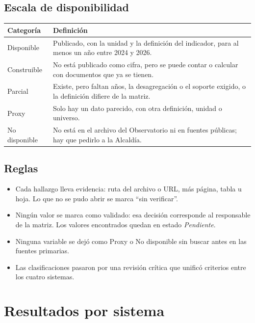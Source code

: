 \documentclass[11pt,letterpaper]{article}
\begin{document}
\subsection{Escala de disponibilidad}
\begin{center}\small
\begin{tabularx}{\linewidth}{L{3cm}Y}
\toprule \textbf{Categoría} & \textbf{Definición} \\ \midrule
{}Disponible & Publicado, con la unidad y la definición del indicador, para al menos un año entre 2024 y 2026. \\
Construible & No está publicado como cifra, pero se puede contar o calcular con documentos que ya se tienen. \\
Parcial & Existe, pero faltan años, la desagregación o el soporte exigido, o la definición difiere de la matriz. \\
Proxy & Solo hay un dato parecido, con otra definición, unidad o universo. \\
No disponible & No está en el archivo del Observatorio ni en fuentes públicas; hay que pedirlo a la Alcaldía. \\
\bottomrule
\end{tabularx}
\end{center}

\subsection{Reglas}
\begin{itemize}
\item Cada hallazgo lleva evidencia: ruta del archivo o URL, más página, tabla u hoja. Lo que no se pudo abrir se marca ``sin verificar''.
\item Ningún valor se marca como validado: esa decisión corresponde al responsable de la matriz. Los valores encontrados quedan en estado \emph{Pendiente}.
\item Ninguna variable se dejó como Proxy o No disponible sin buscar antes en las fuentes primarias.
\item Las clasificaciones pasaron por una revisión crítica que unificó criterios entre los cuatro sistemas.
\end{itemize}


\section{Resultados por sistema}
\end{document}

